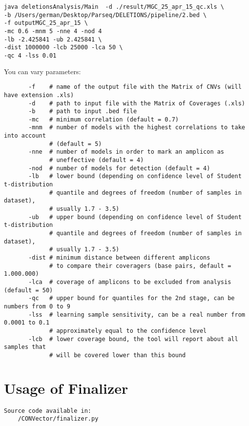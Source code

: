 \documentclass{article}
\begin{document}
\begin{lstlisting}[style=DOS, caption={An example of usage}]
java deletionsAnalysis/Main  -d ./result/MGC_25_apr_15_qc.xls \
-b /Users/german/Desktop/Parseq/DELETIONS/pipeline/2.bed \
-f outputMGC_25_apr_15 \
-mc 0.6 -mnm 5 -nne 4 -nod 4 
-lb -2.425841 -ub 2.425841 \ 
-dist 1000000 -lcb 25000 -lca 50 \
-qc 4 -lss 0.01
\end{lstlisting}


You can vary parameters:
     
\begin{verbatim}
       -f    # name of the output file with the Matrix of CNVs (will have extension .xls)
       -d    # path to input file with the Matrix of Coverages (.xls)
       -b    # path to input .bed file
       -mc   # minimum correlation (default = 0.7)
       -mnm  # number of models with the highest correlations to take into account 
             # (default = 5)
       -nne  # number of models in order to mark an amplicon as 
             # uneffective (default = 4)
       -nod  # number of models for detection (default = 4)
       -lb   # lower bound (depending on confidence level of Student t-distribution 
             # quantile and degrees of freedom (number of samples in dataset), 
             # usually 1.7 - 3.5)
       -ub   # upper bound (depending on confidence level of Student t-distribution 
             # quantile and degrees of freedom (number of samples in dataset), 
             # usually 1.7 - 3.5)
       -dist # minimum distance between different amplicons 
             # to compare their coveragers (base pairs, default = 1.000.000)
       -lca  # coverage of amplicons to be excluded from analysis (default = 50)
       -qc   # upper bound for quantiles for the 2nd stage, can be numbers from 0 to 9
       -lss  # learning sample sensitivity, can be a real number from 0.0001 to 0.1
             # approximately equal to the confidence level
       -lcb  # lower coverage bound, the tool will report about all samples that
             # will be covered lower than this bound
\end{verbatim}









\newpage
\section{Usage of Finalizer}
\begin{verbatim}
Source code available in:
    /CONVector/finalizer.py
\end{verbatim}
\end{document}
